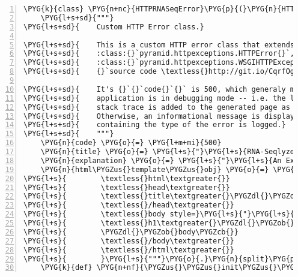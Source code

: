 \begin{Verbatim}[commandchars=\\\{\},numbers=left,firstnumber=1,stepnumber=5]
\PYG{k}{class} \PYG{n+nc}{HTTPRNASeqError}\PYG{p}{(}\PYG{n}{HTTPError}\PYG{p}{)}\PYG{p}{:}
    \PYG{l+s+sd}{"""}
\PYG{l+s+sd}{    Custom HTTP Error class.}

\PYG{l+s+sd}{    This is a custom HTTP error class that extends}
\PYG{l+s+sd}{    :class:{}`pyramid.httpexceptions.HTTPError{}`, which extends}
\PYG{l+s+sd}{    :class:{}`pyramid.httpexceptions.WSGIHTTPException{}`. Have a look at the}
\PYG{l+s+sd}{    {}`source code \textless{}http://git.io/CqrfOg\PYGZsh{}L157\textgreater{}{}`\PYGZus{} to see how it works.}

\PYG{l+s+sd}{    It's {}`{}`code{}`{}` is 500, which generaly means "Internal Server Error".  If the}
\PYG{l+s+sd}{    application is in debugging mode -- i.e. the log level is DEBUG or less, a}
\PYG{l+s+sd}{    stack trace is added to the generated page as well as the log file.}
\PYG{l+s+sd}{    Otherwise, an informational message is displayed and only one line,}
\PYG{l+s+sd}{    containing the type of the error is logged.}
\PYG{l+s+sd}{    """}
    \PYG{n}{code} \PYG{o}{=} \PYG{l+m+mi}{500}
    \PYG{n}{title} \PYG{o}{=} \PYG{l+s}{"}\PYG{l+s}{RNA-Seqlyze Web Application Error}\PYG{l+s}{"}
    \PYG{n}{explanation} \PYG{o}{=} \PYG{l+s}{"}\PYG{l+s}{An Exception was raised in rnaseqlyze.web}\PYG{l+s}{"}
    \PYG{n}{html\PYGZus{}template\PYGZus{}obj} \PYG{o}{=} \PYG{n}{Template}\PYG{p}{(}\PYG{n}{Template}\PYG{p}{(}\PYG{l+s}{'}\PYG{l+s+se}{\PYGZbs{}n}\PYG{l+s}{'}\PYG{o}{.}\PYG{n}{join}\PYG{p}{(}\PYG{n+nb}{map}\PYG{p}{(}\PYG{k}{lambda} \PYG{n}{s}\PYG{p}{:} \PYG{n}{s}\PYG{p}{[}\PYG{l+m+mi}{8}\PYG{p}{:}\PYG{p}{]}\PYG{p}{,} \PYG{l+s}{"""}\PYG{l+s+se}{\PYGZbs{}}
\PYG{l+s}{        \textless{}html\textgreater{}}
\PYG{l+s}{        \textless{}head\textgreater{}}
\PYG{l+s}{        \textless{}title\textgreater{}\PYGZdl{}\PYGZob{}title\PYGZcb{}\textless{}/title\textgreater{}}
\PYG{l+s}{        \textless{}/head\textgreater{}}
\PYG{l+s}{        \textless{}body style=}\PYG{l+s}{"}\PYG{l+s}{margin: 20px;}\PYG{l+s}{"}\PYG{l+s}{\textgreater{}}
\PYG{l+s}{        \textless{}h1\textgreater{}\PYGZdl{}\PYGZob{}title\PYGZcb{}\textless{}/h1\textgreater{}}
\PYG{l+s}{        \PYGZdl{}\PYGZob{}body\PYGZcb{}}
\PYG{l+s}{        \textless{}/body\textgreater{}}
\PYG{l+s}{        \textless{}/html\textgreater{}}
\PYG{l+s}{        }\PYG{l+s}{"""}\PYG{o}{.}\PYG{n}{split}\PYG{p}{(}\PYG{l+s}{'}\PYG{l+s+se}{\PYGZbs{}n}\PYG{l+s}{'}\PYG{p}{)}\PYG{p}{)}\PYG{p}{)}\PYG{p}{)}\PYG{o}{.}\PYG{n}{safe\PYGZus{}substitute}\PYG{p}{(}\PYG{n}{title}\PYG{o}{=}\PYG{n}{title}\PYG{p}{)}\PYG{p}{)}
    \PYG{k}{def} \PYG{n+nf}{\PYGZus{}\PYGZus{}init\PYGZus{}\PYGZus{}}\PYG{p}{(}\PYG{n+nb+bp}{self}\PYG{p}{,} \PYG{n}{exc\PYGZus{}info}\PYG{p}{)}\PYG{p}{:}

\end{Verbatim}
